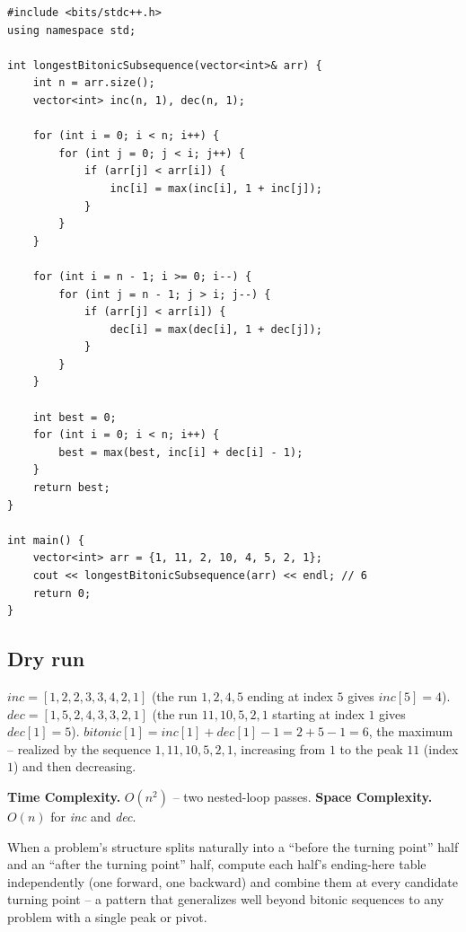 \begin{lstlisting}
#include <bits/stdc++.h>
using namespace std;

int longestBitonicSubsequence(vector<int>& arr) {
    int n = arr.size();
    vector<int> inc(n, 1), dec(n, 1);

    for (int i = 0; i < n; i++) {
        for (int j = 0; j < i; j++) {
            if (arr[j] < arr[i]) {
                inc[i] = max(inc[i], 1 + inc[j]);
            }
        }
    }

    for (int i = n - 1; i >= 0; i--) {
        for (int j = n - 1; j > i; j--) {
            if (arr[j] < arr[i]) {
                dec[i] = max(dec[i], 1 + dec[j]);
            }
        }
    }

    int best = 0;
    for (int i = 0; i < n; i++) {
        best = max(best, inc[i] + dec[i] - 1);
    }
    return best;
}

int main() {
    vector<int> arr = {1, 11, 2, 10, 4, 5, 2, 1};
    cout << longestBitonicSubsequence(arr) << endl; // 6
    return 0;
}
\end{lstlisting}

\subsection*{Dry run}


$\textit{inc} = [1,2,2,3,3,4,2,1]$ (the run $1,2,4,5$ ending at index
$5$ gives $\textit{inc}[5]=4$). $\textit{dec} = [1,5,2,4,3,3,2,1]$ (the
run $11,10,5,2,1$ starting at index $1$ gives $\textit{dec}[1]=5$).
$\textit{bitonic}[1] = \textit{inc}[1]+\textit{dec}[1]-1 = 2+5-1=6$,
the maximum -- realized by the sequence $1,11,10,5,2,1$, increasing
from $1$ to the peak $11$ (index $1$) and then decreasing.

\begin{complexitybox}
\textbf{Time Complexity.} $O(n^2)$ -- two nested-loop passes.
\textbf{Space Complexity.} $O(n)$ for \textit{inc} and \textit{dec}.
\end{complexitybox}

\begin{takeawaybox}
When a problem's structure splits naturally into a ``before the
turning point'' half and an ``after the turning point'' half, compute
each half's ending-here table independently (one forward, one
backward) and combine them at every candidate turning point -- a
pattern that generalizes well beyond bitonic sequences to any
problem with a single peak or pivot.
\end{takeawaybox}
